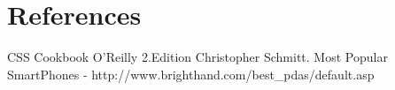 \section{References}
CSS Cookbook O'Reilly 2.Edition Christopher Schmitt.
Most Popular SmartPhones - http://www.brighthand.com/best\_pdas/default.asp
